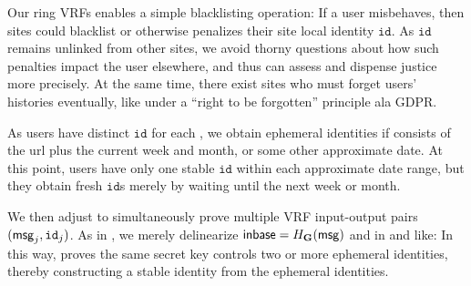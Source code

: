 {\begin{comment}
There is however a natural {\em exculpable public key} flavor $(\pk,\sigma)$,
in which
$\sigma = \Sign(\sk, \CommitRing(\{ \pk \},\pk).\openring, \mathtt{ring\_name}, \mathtt{""})$.
The singleton ring $\{ \pk \}$ ensure that 
$\rVerify(\CommitRing(\{\pk\}), \mathtt{ring\_name}, \mathtt{""}, \sigma)$
uniquely determines the secret key, so exculpability holds
if joining the ring requires $(\pk,\sigma)$.

\eprint{}{\end{comment}}

Our ring VRFs enables a simple blacklisting operation:
If a user misbehaves, then sites could blacklist or otherwise penalizes
their site local identity $\mathtt{id}$.
As $\mathtt{id}$ remains unlinked from other sites, we avoid thorny
questions about how such penalties impact the user elsewhere, and thus
can assess and dispense justice more precisely. 
At the same time, there exist sites who must forget users' histories
eventually, like under a ``right to be forgotten'' principle ala GDPR.

As users have distinct $\mathtt{id}$ for each \msg,
we obtain ephemeral identities if \msg consists of the url plus
the current week and month, or some other approximate date.
At this point, users have only one stable $\mathtt{id}$ within each
approximate date range, but they obtain fresh $\mathtt{id}$s merely
by waiting until the next week or month.

We then adjust \PedVRF to simultaneously prove multiple VRF input-output
pairs $(\mathsf{msg}_j,\mathtt{id}_j)$.  As in \cite{PrivacyPass}, we merely
delinearize $ {\mathsf{inbase}}  = H_{\mathbf{G}}(\mathsf{msg})$ and \PreOut in \rSign and \rVerify like:
In this way, \PedVRF proves the same secret key controls two or more
ephemeral identities, thereby constructing a stable identity from the
ephemeral identities.

